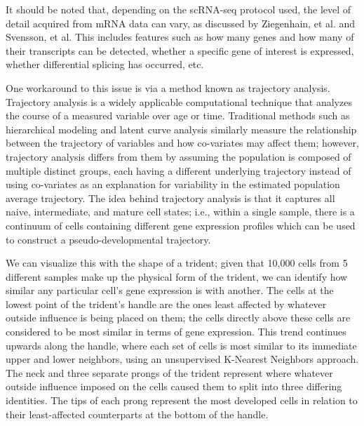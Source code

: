 \documentclass{article}
\begin{document}

It should be noted that, depending on the scRNA-seq protocol used, the level of detail acquired from mRNA data can vary, as discussed by Ziegenhain, et al. and Svensson, et al. This includes features such as how many genes and how many of their transcripts can be detected, whether a specific gene of interest is expressed, whether differential splicing has occurred, etc.

One workaround to this issue is via a method known as trajectory analysis. Trajectory analysis is a widely applicable computational technique that analyzes the course of a measured variable over age or time. Traditional methods such as hierarchical modeling and latent curve analysis similarly measure the relationship between the trajectory of variables and how co-variates may affect them; however, trajectory analysis differs from them by assuming the population is composed of multiple distinct groups, each having a different underlying trajectory instead of using co-variates as an explanation for variability in the estimated population average trajectory. The idea behind trajectory analysis is that it captures all naive, intermediate, and mature cell states; i.e., within a single sample, there is a continuum of cells containing different gene expression profiles which can be used to construct a pseudo-developmental trajectory.

We can visualize this with the shape of a trident; given that 10,000 cells from 5 different samples make up the physical form of the trident, we can identify how similar any particular cell's gene expression is with another. The cells at the lowest point of the trident's handle are the ones least affected by whatever outside influence is being placed on them; the cells directly above these cells are considered to be most similar in terms of gene expression. This trend continues upwards along the handle, where each set of cells is most similar to its immediate upper and lower neighbors, using an unsupervised K-Nearest Neighbors approach. The neck and three separate prongs of the trident represent where whatever outside influence imposed on the cells caused them to split into three differing identities. The tips of each prong represent the most developed cells in relation to their least-affected counterparts at the bottom of the handle.
\end{document}
